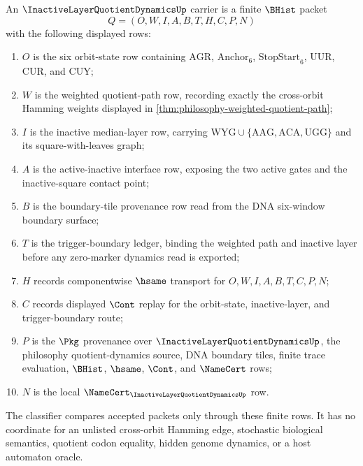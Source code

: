 \begin{definition}
\label{def:inactive-layer-quotient-dynamics-carrier}
An $\InactiveLayerQuotientDynamicsUp$ carrier is a finite $\BHist$ packet
$$
Q=(O,W,I,A,B,T,H,C,P,N)
$$
with the following displayed rows:
\begin{enumerate}
\item $O$ is the six orbit-state row containing $\mathrm{AGR}$, $\mathrm{Anchor}_{6}$, $\mathrm{StopStart}_{6}$, $\mathrm{UUR}$, $\mathrm{CUR}$, and $\mathrm{CUY}$;
\item $W$ is the weighted quotient-path row, recording exactly the cross-orbit Hamming weights displayed in \autoref{thm:philosophy-weighted-quotient-path};
\item $I$ is the inactive median-layer row, carrying $\mathrm{WYG}\cup\{\mathrm{AAG},\mathrm{ACA},\mathrm{UGG}\}$ and its square-with-leaves graph;
\item $A$ is the active-inactive interface row, exposing the two active gates and the inactive-square contact point;
\item $B$ is the boundary-tile provenance row read from the DNA six-window boundary surface;
\item $T$ is the trigger-boundary ledger, binding the weighted path and inactive layer before any zero-marker dynamics read is exported;
\item $H$ records componentwise $\hsame$ transport for $O,W,I,A,B,T,C,P,N$;
\item $C$ records displayed $\Cont$ replay for the orbit-state, inactive-layer, and trigger-boundary route;
\item $P$ is the $\Pkg$ provenance over $\InactiveLayerQuotientDynamicsUp$, the philosophy quotient-dynamics source, DNA boundary tiles, finite trace evaluation, $\BHist$, $\hsame$, $\Cont$, and $\NameCert$ rows;
\item $N$ is the local $\NameCert_{\InactiveLayerQuotientDynamicsUp}$ row.
\end{enumerate}
The classifier compares accepted packets only through these finite rows. It has no coordinate for an unlisted cross-orbit Hamming edge, stochastic biological semantics, quotient codon equality, hidden genome dynamics, or a host automaton oracle.
\end{definition}

